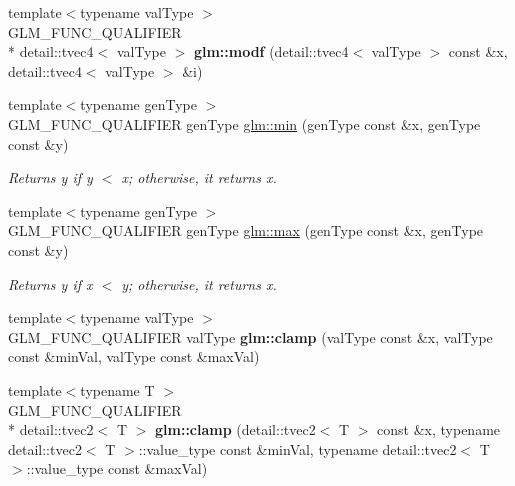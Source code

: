 \begin{DoxyCompactItemize}
\item 
\hypertarget{namespaceglm_a6c9328d6bc7d557600ec52f2e5115ef5}{{\footnotesize template$<$typename val\-Type $>$ }\\G\-L\-M\-\_\-\-F\-U\-N\-C\-\_\-\-Q\-U\-A\-L\-I\-F\-I\-E\-R \\*
detail\-::tvec4$<$ val\-Type $>$ {\bfseries glm\-::modf} (detail\-::tvec4$<$ val\-Type $>$ const \&x, detail\-::tvec4$<$ val\-Type $>$ \&i)}\label{namespaceglm_a6c9328d6bc7d557600ec52f2e5115ef5}

\item 
{\footnotesize template$<$typename gen\-Type $>$ }\\G\-L\-M\-\_\-\-F\-U\-N\-C\-\_\-\-Q\-U\-A\-L\-I\-F\-I\-E\-R gen\-Type \hyperlink{group__core__func__common_ga0d2bb6c2caad4acf992e6dcd41a626fe}{glm\-::min} (gen\-Type const \&x, gen\-Type const \&y)
\begin{DoxyCompactList}\small\item\em Returns y if y $<$ x; otherwise, it returns x. \end{DoxyCompactList}\item 
{\footnotesize template$<$typename gen\-Type $>$ }\\G\-L\-M\-\_\-\-F\-U\-N\-C\-\_\-\-Q\-U\-A\-L\-I\-F\-I\-E\-R gen\-Type \hyperlink{group__core__func__common_ga3f6af26fbb056e0fc8a04ddc8871add2}{glm\-::max} (gen\-Type const \&x, gen\-Type const \&y)
\begin{DoxyCompactList}\small\item\em Returns y if x $<$ y; otherwise, it returns x. \end{DoxyCompactList}\item 
\hypertarget{namespaceglm_a435097f73fa7b698ddc54945bfba1c34}{{\footnotesize template$<$typename val\-Type $>$ }\\G\-L\-M\-\_\-\-F\-U\-N\-C\-\_\-\-Q\-U\-A\-L\-I\-F\-I\-E\-R val\-Type {\bfseries glm\-::clamp} (val\-Type const \&x, val\-Type const \&min\-Val, val\-Type const \&max\-Val)}\label{namespaceglm_a435097f73fa7b698ddc54945bfba1c34}

\item 
\hypertarget{namespaceglm_ae7c2c75cfb6649f39e832598cb0842f8}{{\footnotesize template$<$typename T $>$ }\\G\-L\-M\-\_\-\-F\-U\-N\-C\-\_\-\-Q\-U\-A\-L\-I\-F\-I\-E\-R \\*
detail\-::tvec2$<$ T $>$ {\bfseries glm\-::clamp} (detail\-::tvec2$<$ T $>$ const \&x, typename detail\-::tvec2$<$ T $>$\-::value\-\_\-type const \&min\-Val, typename detail\-::tvec2$<$ T $>$\-::value\-\_\-type const \&max\-Val)}\label{namespaceglm_ae7c2c75cfb6649f39e832598cb0842f8}


\end{DoxyCompactItemize}

